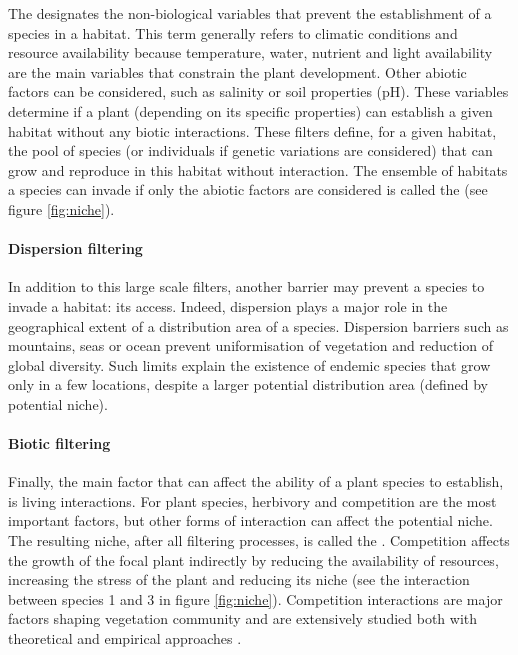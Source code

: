 The  designates the non-biological variables that prevent the establishment of a species in a habitat. This term generally refers to climatic conditions and resource availability because temperature, water, nutrient and light availability are the main variables that constrain the plant development. Other abiotic factors can be considered, such as salinity \cite{poorter_leaf_2006} or soil properties (pH). These variables determine if a plant (depending on its specific properties) can establish a given habitat without any biotic interactions. These filters define, for a given habitat, the pool of species (or individuals if genetic variations are considered) that can grow and reproduce in this habitat without interaction. The ensemble of habitats a species can invade if only the abiotic factors are considered is called the  (see figure \ref{fig:niche}). 

\paragraph{Dispersion filtering}

In addition to this large scale filters, another barrier may prevent a species to invade a habitat: its access. Indeed, dispersion plays a major role in the geographical extent of a distribution area of a species. Dispersion barriers such as mountains, seas or ocean prevent uniformisation of vegetation and reduction of global diversity. Such limits explain the existence of endemic species that grow only in a few locations, despite a larger potential distribution area (defined by potential niche).




\paragraph{Biotic filtering}

Finally, the main factor that can affect the ability of a plant species to establish, is living interactions. For plant species, herbivory and competition are the most important factors, but other forms of interaction can affect the potential niche. The resulting niche, after all filtering processes, is called the . Competition affects the growth of the focal plant indirectly by reducing the availability of resources, increasing the stress of the plant and reducing its niche (see the interaction between species 1 and 3 in figure \ref{fig:niche}). Competition interactions are major factors shaping vegetation community and are extensively studied both with theoretical \parencite{chesson_general_2000, amarasekare_competitive_2003} and empirical approaches \parencite{kunstler_plant_2016}.

